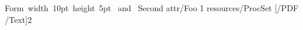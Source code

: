  
\hbox{Form \vrule width 10pt height 5pt}
\immediate{} \edef\f{\the\pdflastxform}
\hbox{\pdfrefxform\f\ and \pdfrefxform\f}\vfill\eject
{}\hbox{Second} \pdfxform attr{/Foo 1} resources{/ProcSet [/PDF /Text]}2
\hbox{\pdfrefxform\f \pdfrefxform\pdflastxform}\bye
